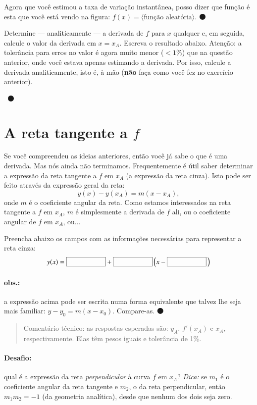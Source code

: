 \documentclass[fleqn,12pt]{scrartcl}
\newenvironment{ct}{\begin{quotation}\color{red!30!black}\sffamily\small Comentário técnico:}{\end{quotation}} %
\newcommand\proceed{\textcolor{green!50!black}{$\medbullet$}\xspace}
\newcommand\parametro[1]{\ensuremath{\langle\text{#1}\rangle}}
\newcommand\answerfield{\framebox[3cm]{\phantom{A}}~\proceed}
\newcommand\shortanswerfield{\framebox[2cm]{\phantom{A}}}
\begin{document}
    Agora que você estimou a taxa de variação instantânea, posso dizer que função é esta que você está vendo na figura: $f(x) = \parametro{função aleatória}$. \proceed

    Determine --- analiticamente --- a derivada de $f$ para $x$ qualquer e, em seguida, calcule o valor da derivada em $x = x_A$. Escreva o resultado abaixo. Atenção: a tolerância para erros no valor é agora muito menor ($< 1\%$) que na questão anterior, onde você estava apenas estimando a derivada. Por isso, calcule a derivada analiticamente, isto é, à mão (\textbf{não} faça como você fez no exercício anterior).

    \answerfield

    \section{A reta tangente a $f$}

    Se você compreendeu as ideias anteriores, então você já sabe o que é uma derivada. Mas nós ainda não terminamos. Frequentemente é útil saber determinar a expressão da reta tangente a $f$ em $x_A$ (a expressão da reta cinza). Isto pode ser feito através da expressão geral da reta:
    \begin{equation*}
	y(x) - y(x_A) = m (x - x_A),
    \end{equation*}
    onde $m$ é o coeficiente angular da reta. Como estamos interessados na reta tangente a $f$ em $x_A$, $m$ é simplesmente a derivada de $f$ ali, ou o coeficiente angular de $f$ em $x_A$, ou...
   
    Preencha abaixo os campos com as informações necessárias para representar a reta cinza:
    \begin{equation*}
        y(x) = \shortanswerfield + \shortanswerfield \left(x - \shortanswerfield\,\right)
    \end{equation*}

    \paragraph{obs.:} a expressão acima pode ser escrita numa forma equivalente que talvez lhe seja mais familiar: $y - y_0 = m(x - x_0)$. Compare-as. \proceed

    \begin{ct}
	as respostas esperadas são: $y_A$, $f'(x_A)$ e $x_A$, respectivamente. Elas têm pesos iguais e tolerância de 1\%.
    \end{ct}

    \paragraph{Desafio:} qual é a expressão da reta \emph{perpendicular} à curva $f$ em $x_A$? \emph{Dica:} se $m_1$ é o coeficiente angular da reta tangente e $m_2$, o da reta perpendicular, então $m_1 m_2 = -1$ (da geometria analítica), desde que nenhum dos dois seja zero.
\end{document}
